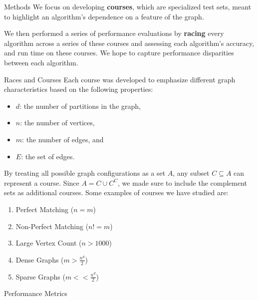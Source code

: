 \documentclass[final]{beamer}
\newlength{\onecolwid}
\begin{document}
\begin{columns}[t]
\begin{column}{\onecolwid}
      \begin{block}{Methods}
        \noindent
        We focus on developing \textbf{courses}, which are specialized test sets, meant to highlight an algorithm's dependence on a feature of the graph. 

        We then performed a series of performance evaluations by \textbf{racing} every algorithm across a series of these courses and assessing each algorithm’s accuracy, and run time on these courses. We hope to capture performance disparities between each algorithm.        
        
      \end{block}

      \begin{block}{Races and Courses}        
      \noindent
        Each course was developed to emphasize different graph characteristics based on the following properties:
        \begin{itemize}
            \item $d$: the number of partitions in the graph,
            \item $n$: the number of vertices,
            \item $m$: the number of edges, and
            \item $E$: the set of edges.
        \end{itemize}
        By treating all possible graph configurations as a set $A$, any subset $C\subseteq A$ can represent a course. Since $A = C \cup C^C$, we made sure to include the complement sets as additional courses. Some examples of courses we have studied are:
        \begin{enumerate}
        \item Perfect Matching ($n=m$)
        \item Non-Perfect Matching ($n!=m$)
        \item Large Vertex Count ($n>1000$)
        \item Dense Graphs ($m > \frac{n^d}{2}$)
        \item Sparse Graphs ($m << \frac{n^d}{2}$)
        \end{enumerate}
      

      \end{block}
      \begin{block}{Performance Metrics}



\end{block}
\end{column}
\end{columns}
\end{document}

